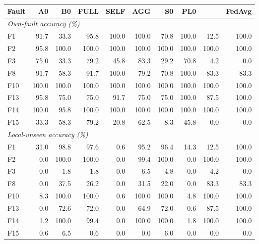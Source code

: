 \begin{tabular}{lrrrrrrrrr}
\toprule
Fault & A0 & B0 & FULL & SELF & AGG & S0 & PL0 & \PROTO{} & FedAvg \\
\midrule
\multicolumn{10}{l}{\emph{Own-fault accuracy (\%)}} \\
F1 & 91.7 & 33.3 & 95.8 & 100.0 & 100.0 & 70.8 & 100.0 & 12.5 & 100.0 \\
F2 & 95.8 & 100.0 & 100.0 & 100.0 & 100.0 & 100.0 & 100.0 & 100.0 & 100.0 \\
F3 & 75.0 & 33.3 & 79.2 & 45.8 & 83.3 & 29.2 & 70.8 & 4.2 & 0.0 \\
F8 & 91.7 & 58.3 & 91.7 & 100.0 & 79.2 & 70.8 & 100.0 & 83.3 & 83.3 \\
F10 & 100.0 & 100.0 & 100.0 & 100.0 & 100.0 & 100.0 & 100.0 & 100.0 & 100.0 \\
F13 & 95.8 & 75.0 & 75.0 & 91.7 & 75.0 & 75.0 & 100.0 & 87.5 & 100.0 \\
F14 & 100.0 & 95.8 & 100.0 & 100.0 & 100.0 & 100.0 & 100.0 & 100.0 & 100.0 \\
F15 & 33.3 & 58.3 & 79.2 & 20.8 & 62.5 & 8.3 & 45.8 & 0.0 & 0.0 \\
\midrule
\multicolumn{10}{l}{\emph{Local-unseen accuracy (\%)}} \\
F1 & 31.0 & 98.8 & 97.6 & 0.6 & 95.2 & 96.4 & 14.3 & 12.5 & 100.0 \\
F2 & 0.0 & 100.0 & 100.0 & 0.0 & 99.4 & 100.0 & 0.0 & 100.0 & 100.0 \\
F3 & 0.0 & 1.8 & 1.8 & 0.0 & 6.5 & 4.8 & 0.0 & 4.2 & 0.0 \\
F8 & 0.0 & 37.5 & 26.2 & 0.0 & 31.5 & 22.0 & 0.0 & 83.3 & 83.3 \\
F10 & 8.3 & 100.0 & 100.0 & 0.6 & 100.0 & 100.0 & 4.8 & 100.0 & 100.0 \\
F13 & 0.0 & 72.6 & 72.0 & 0.0 & 64.9 & 72.0 & 0.6 & 87.5 & 100.0 \\
F14 & 1.2 & 100.0 & 99.4 & 0.0 & 100.0 & 100.0 & 1.8 & 100.0 & 100.0 \\
F15 & 0.6 & 6.5 & 0.6 & 0.0 & 0.0 & 6.0 & 0.0 & 0.0 & 0.0 \\
\bottomrule
\end{tabular}
